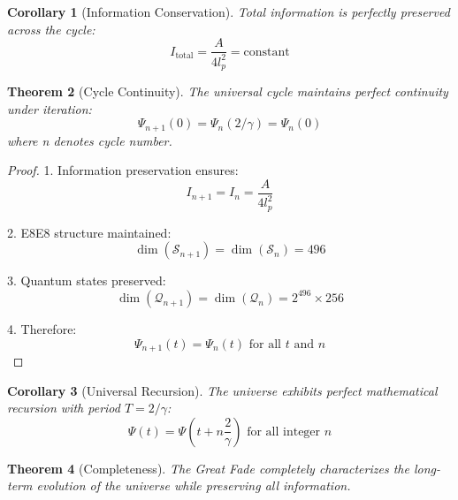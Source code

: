 \documentclass{article}
\newtheorem{theorem}{Theorem}
\newtheorem{corollary}[theorem]{Corollary}
\begin{document}
\begin{corollary}[Information Conservation]
Total information is perfectly preserved across the cycle:
\begin{equation}
I_{\text{total}} = \frac{A}{4l_{p}^2} = \text{constant}
\end{equation}
\end{corollary}

\begin{theorem}[Cycle Continuity]
The universal cycle maintains perfect continuity under iteration:
\begin{equation}
\Psi_{n+1}(0) = \Psi_n(2/\gamma) = \Psi_n(0)
\end{equation}
where n denotes cycle number.
\end{theorem}

\begin{proof}
1. Information preservation ensures:
   \begin{equation}
   I_{n+1} = I_n = \frac{A}{4l_{p}^2}
   \end{equation}

2. E8\times E8 structure maintained:
   \begin{equation}
   \dim(\mathcal{S}_{n+1}) = \dim(\mathcal{S}_n) = 496
   \end{equation}

3. Quantum states preserved:
   \begin{equation}
   \dim(\mathcal{Q}_{n+1}) = \dim(\mathcal{Q}_n) = 2^{496} \times 256
   \end{equation}

4. Therefore:
   \begin{equation}
   \Psi_{n+1}(t) = \Psi_n(t) \text{ for all } t \text{ and } n
   \end{equation}
\end{proof}

\begin{corollary}[Universal Recursion]
The universe exhibits perfect mathematical recursion with period $T = 2/\gamma$:
\begin{equation}
\Psi(t) = \Psi(t + n\frac{2}{\gamma}) \text{ for all integer } n
\end{equation}
\end{corollary}

\begin{theorem}[Completeness]
The Great Fade completely characterizes the long-term evolution of the universe while preserving all information.
\end{theorem}
\end{document}
